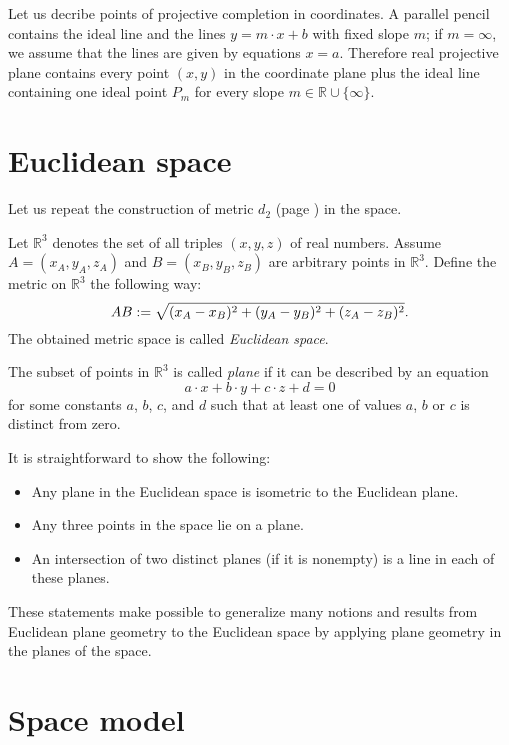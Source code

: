 Let us decribe points of projective completion in coordinates.
A parallel pencil contains the ideal line and the lines $y=m\cdot x+b$ with fixed slope $m$;
if $m=\infty$, we assume that the lines are given by equations $x=a$.
Therefore real projective plane contains every point $(x,y)$ in the coordinate plane plus the ideal line containing one ideal point $P_m$ for every slope $m\in\mathbb{R}\cup\{\infty\}$.




\section*{Euclidean space}

Let us repeat the construction of metric $d_2$ (page 
\pageref{def:d_2}) in the space.

Let $\mathbb{R}^3$ denotes the set of all triples $(x,y,z)$ of real numbers.
Assume $A=(x_A,y_A,z_A)$ and $B=(x_B,y_B,z_B)$ are arbitrary points in $\mathbb{R}^3$.
Define the metric on $\mathbb{R}^3$ the following way:
$$AB
:=
\sqrt{(x_A-x_B)^2+(y_A-y_B)^2+(z_A-z_B)^2}.$$
The obtained metric space is called \emph{Euclidean space}.

The subset of points in $\mathbb{R}^3$ is called \emph{plane} if it can be
described by an equation
$$a\cdot x+b\cdot y+c\cdot z+d=0$$ 
for some constants $a$, $b$, $c$, and $d$ such that at least one of values $a$, $b$ or $c$ is distinct from zero.

It is straightforward to show the following:
\begin{itemize}
 \item Any plane in the Euclidean space is isometric to the Euclidean plane.
 \item Any three points in the space lie on a plane.
 \item An intersection of two distinct planes (if it is nonempty) is a line in each of these planes.
\end{itemize}

These statements make possible to generalize many notions and results from Euclidean plane geometry to the Euclidean space
by applying plane geometry in the planes of the space.

\section*{Space model}

